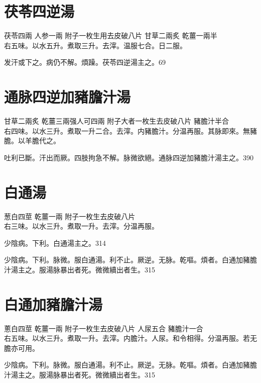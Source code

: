 \section{茯苓四逆湯}

茯苓{\scriptsize 四兩} 人参{\scriptsize 一兩} 附子{\scriptsize 一枚生用去皮破八片} 甘草{\scriptsize 二兩炙} 乾薑{\scriptsize 一兩半}\\
右五味。以水五升。煮取三升。去滓。温服七合。日二服。

发汗或下之。{\khaaitp 病仍}不解。煩躁。茯苓四逆湯主之。69

\section{通脉四逆加豬膽汁湯}

甘草{\scriptsize 二兩炙} 乾薑{\scriptsize 三兩强人可四兩} 附子{\scriptsize 大者一枚生去皮破八片} 豬膽汁{\scriptsize 半合}\\
右四味。以水三升。煮取一升二合。去滓。内豬膽汁。分温再服。其脉即來。無豬膽。以羊膽代之。

吐利已斷。汗出而厥。四肢拘急不解。脉微欲絕。通脉四逆加豬膽汁湯主之。390

\section{白通湯}

葱白{\scriptsize 四莖} 乾薑{\scriptsize 一兩} 附子{\scriptsize 一枚生去皮破八片}\\
右三味。以水三升。煮取一升。去滓。分温再服。

少陰病。下利。白通湯主之。314

少陰病。下利。脉微。服白通湯。利不止。厥逆。无脉。乾嘔。煩者。白通加豬膽汁湯主之。服湯脉暴出者死。微{\khaaitp 微}續{\khaaitp 出}者生。315

\section{白通加豬膽汁湯}

蔥白{\scriptsize 四莖} 乾薑{\scriptsize 一兩} 附子{\scriptsize 一枚生去皮破八片} 人尿{\scriptsize 五合} 豬膽汁{\scriptsize 一合}\\
右五味。以水三升。煮取一升。去滓。内膽汁。人尿。和令相得。分温再服。若无膽亦可用。

少陰病。下利。脉微。服白通湯。利不止。厥逆。无脉。乾嘔。煩者。白通加豬膽汁湯主之。服湯脉暴出者死。微{\khaaitp 微}續{\khaaitp 出}者生。315

